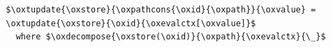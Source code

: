 \begin{lstlisting}
  $\oxtupdate{\oxstore}{\oxpathcons{\oxid}{\oxpath}}{\oxvalue} =
  \oxtupdate{\oxstore}{\oxid}{\oxevalctx[\oxvalue]}$
    where $\oxdecompose{\oxstore(\oxid)}{\oxpath}{\oxevalctx}{\_}$
\end{lstlisting}
